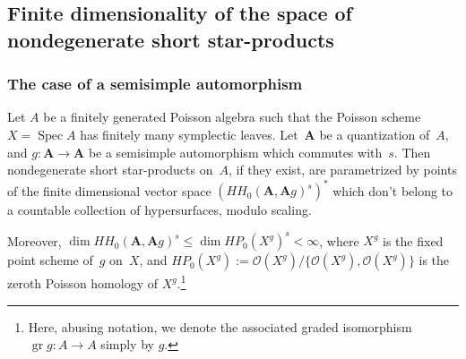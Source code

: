 \subsection{Finite dimensionality of the space of nondegenerate short star-products}

\subsubsection{The case of a semisimple automorphism}

\begin{Proposition}\label{finde1} Let $A$ be a finitely generated Poisson algebra such that the Poisson scheme $X=\operatorname{Spec}A$ has finitely many symplectic leaves. Let~${\mathbf A}$ be a quantization of~$A$, and \mbox{$g\colon {{\mathbf A}}\to {{\mathbf A}}$} be a semisimple automorphism which commutes with~$s$. Then nondegenerate short star-products on~$A$, if they exist, are parametrized by points of the finite dimensional vector space \linebreak $(HH_0({{\mathbf A}},{{\mathbf A}}g)^s)^*$ which don't belong to a countable collection of hypersurfaces, modulo scaling.

Moreover, $\dim HH_0({{\mathbf A}},{{\mathbf A}}g)^s\le \dim HP_0(X^g)^s<\infty$, where $X^g$ is the fixed point scheme of~$g$ on~$X$, and $HP_0(X^g):= \mathcal{O}(X^g)/\lbrace{\mathcal{O}(X^g), \mathcal{O}(X^g)\rbrace}$ is the zeroth Poisson homology of $X^g$.\footnote{Here, abusing notation, we denote the associated graded isomorphism $\operatorname{gr}g\colon A\to A$ simply by $g$.}
\end{Proposition}

